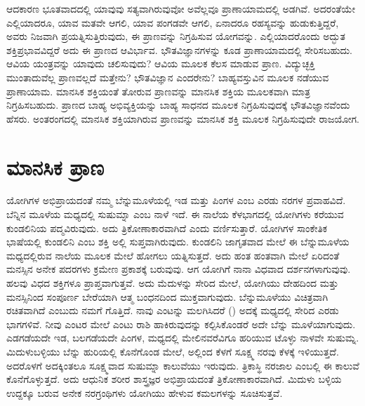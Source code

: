 ಆದಕಾರಣ ಭೂತವಾದದಲ್ಲಿ ಯಾವುವು ಸತ್ಯವಾಗಿರುವುವೋ ಅವೆಲ್ಲವೂ ಪ್ರಾಣಾಯಾಮದಲ್ಲಿ ಅಡಗಿವೆ. ಅದರಂತೆಯೇ ಎಲ್ಲಿಯಾದರೂ, ಯಾವ ಮತವೇ ಆಗಲಿ, ಯಾವ ಪಂಗಡವೇ ಆಗಲಿ, ಏನಾದರೂ ರಹಸ್ಯವನ್ನು ಹುಡುಕುತ್ತಿದ್ದರೆ, ಅವರು ನಿಜವಾಗಿ ಪ್ರಯತ್ನಿಸುತ್ತಿರುವುದು, ಈ ಪ್ರಾಣವನ್ನು ನಿಗ್ರಹಿಸುವ ಯೋಗವನ್ನು. ಎಲ್ಲಿಯಾದರೊಂದು ಅದ್ಭುತ ಶಕ್ತಿಪ್ರಭಾವವಿದ್ದರೆ ಅದು ಈ ಪ್ರಾಣದ ಆವಿರ್ಭಾವ. ಭೌತವಿಜ್ಞಾನಗಳನ್ನು ಕೂಡ ಪ್ರಾಣಾಯಾಮದಲ್ಲಿ ಸೇರಿಸಬಹುದು. ಆವಿಯ ಯಂತ್ರವನ್ನು ಯಾವುದು ಚಲಿಸುವುದು? ಆವಿಯ ಮೂಲಕ ಕೆಲಸ ಮಾಡುವ ಪ್ರಾಣ. ವಿದ್ಯುಚ್ಛಕ್ತಿ ಮುಂತಾದುವೆಲ್ಲ ಪ್ರಾಣವಲ್ಲದೆ ಮತ್ತೇನು? ಭೌತವಿಜ್ಞಾನ ಎಂದರೇನು? ಬಾಹ್ಯವಸ್ತುವಿನ ಮೂಲಕ ನಡೆಯುವ ಪ್ರಾಣಾಯಾಮ. ಮಾನಸಿಕ ಶಕ್ತಿಯಂತೆ ತೋರುವ ಪ್ರಾಣವನ್ನು ಮಾನಸಿಕ ಶಕ್ತಿಯ ಮೂಲಕವಾಗಿ ಮಾತ್ರ ನಿಗ್ರಹಿಸಬಹುದು. ಪ್ರಾಣದ ಬಾಹ್ಯ ಅಭಿವ್ಯಕ್ತಿಯನ್ನು ಬಾಹ್ಯ ಸಾಧನದ ಮೂಲಕ ನಿಗ್ರಹಿಸುವುದಕ್ಕೆ ಭೌತವಿಜ್ಞಾನವೆಂದು ಹೆಸರು. ಅಂತರಂಗದಲ್ಲಿ ಮಾನಸಿಕ ಶಕ್ತಿಯಾಗಿರುವ ಪ್ರಾಣವನ್ನು ಮಾನಸಿಕ ಶಕ್ತಿ ಮೂಲಕ ನಿಗ್ರಹಿಸುವುದೇ ರಾಜಯೋಗ.

\chapter{ಮಾನಸಿಕ ಪ್ರಾಣ}%

ಯೋಗಿಗಳ ಅಭಿಪ್ರಾಯದಂತೆ ನಮ್ಮ ಬೆನ್ನುಮೂಳೆಯಲ್ಲಿ ಇಡ ಮತ್ತು ಪಿಂಗಳ ಎಂಬ ಎರಡು ನರಗಳ ಪ್ರವಾಹವಿದೆ. ಬೆನ್ನಿನ ಮೂಳೆಯ ಮಧ್ಯದಲ್ಲಿ ಸುಷುಮ್ನಾ ಎಂಬ ನಾಳೆ ಇದೆ. ಈ ನಾಲೆಯ ಕೆಳಭಾಗದಲ್ಲಿ ಯೋಗಿಗಳು ಕರೆಯುವ ಕುಂಡಲಿನಿಯ ಪದ್ಮವಿರುವುದು. ಅದು ತ್ರಿಕೋಣಾಕಾರವಾಗಿದೆ ಎಂದು ವರ್ಣಿಸುತ್ತಾರೆ. ಯೋಗಿಗಳ ಸಾಂಕೇತಿಕ ಭಾಷೆಯಲ್ಲಿ ಕುಂಡಲಿನಿ ಎಂಬ ಶಕ್ತಿ ಅಲ್ಲಿ ಸುಪ್ತವಾಗಿರುವುದು. ಕುಂಡಲಿನಿ ಜಾಗೃತವಾದ ಮೇಲೆ ಈ ಬೆನ್ನುಮೂಳೆಯ ಮಧ್ಯದಲ್ಲಿರುವ ನಾಲೆಯ ಮೂಲಕ ಮೇಲೆ ಹೋಗಲು ಯತ್ನಿಸುತ್ತದೆ. ಅದು ಹಂತ ಹಂತವಾಗಿ ಮೇಲೆ ಏರಿದಂತೆ ಮನಸ್ಸಿನ ಅನೇಕ ಪದರಗಳು ಕ್ರಮೇಣ ಪ್ರಕಾಶಕ್ಕೆ ಬರುವುವು. ಆಗ ಯೋಗಿಗೆ ನಾನಾ ವಿಧವಾದ ದರ್ಶನಗಳಾಗುವುವು. ಹಲವು ವಿಧದ ಶಕ್ತಿಗಳೂ ಪ್ರಾಪ್ತವಾಗುತ್ತವೆ. ಅದು ಮೆದುಳನ್ನು ಸೇರಿದ ಮೇಲೆ, ಯೋಗಿಯು ದೇಹದಿಂದ ಮತ್ತು ಮನಸ್ಸಿನಿಂದ ಸಂಪೂರ್ಣ ಬೇರೆಯಾಗಿ ಆತ್ಮ ಬಂಧನದಿಂದ ಮುಕ್ತವಾಗುವುದು. ಬೆನ್ನುಮೂಳೆಯು ವಿಚಿತ್ರವಾಗಿ ರಚಿತವಾಗಿದೆ ಎಂಬುದು ನಮಗೆ ಗೊತ್ತಿದೆ. ನಾವು ಎಂಟನ್ನು ಮಲಗಿಸಿದರೆ () ಅದಕ್ಕೆ ಮಧ್ಯದಲ್ಲಿ ಸೇರಿದ ಎರಡು ಭಾಗಗಳಿವೆ. ನೀವು ಎಂಟರ ಮೇಲೆ ಎಂಟು ರಾಶಿ ಹಾಕಿರುವುದನ್ನು ಕಲ್ಪಿಸಿಕೊಂಡರೆ ಅದೇ ಬೆನ್ನು ಮೂಳೆಯಾಗುವುದು. ಎಡಗಡೆಯದೇ ಇಡ, ಬಲಗಡೆಯದೇ ಪಿಂಗಳ, ಮಧ್ಯದಲ್ಲಿ ಮೇಲಿನವರೆವಿಗೂ ಹರಿಯುವ ಟೊಳ್ಳು ನಾಳವೇ ಸುಷುಮ್ನ. ಮಿದುಳುಬಳ್ಳಿಯು ಬೆನ್ನು ಹುರಿಯಲ್ಲಿ ಕೊನೆಗೊಂಡ ಮೇಲೆ, ಅಲ್ಲಿಂದ ಕೆಳಗೆ ಸೂಕ್ಷ್ಮ ನರವು ಕೆಳಕ್ಕೆ ಇಳಿಯುತ್ತದೆ. ಅದರೊಳಗೆ ಅದಕ್ಕಿಂತಲೂ ಸೂಕ್ಷ್ಮವಾದ ಸುಷುಮ್ನಾ ಕಾಲುವೆಯು ಇರುವುದು. ತ್ರಿಕಾಸ್ಥಿ  ನರಜಾಲ ಎಂಬಲ್ಲಿ ಈ ಕಾಲುವೆ ಕೊನೆಗೊಳ್ಳುತ್ತದೆ. ಅದು ಆಧುನಿಕ ಶರೀರ ಶಾಸ್ತ್ರಜ್ಞರ ಅಭಿಪ್ರಾಯದಂತೆ ತ್ರಿಕೋಣಾಕಾರವಾಗಿದೆ. ಮಿದುಳು ಬಳ್ಳಿಯ ಉದ್ದಕ್ಕೂ ಬರುವ ಅನೇಕ ನರಗ್ರಂಥಿಗಳು ಯೋಗಿಯು ಹೇಳುವ ಕಮಲಗಳನ್ನು ಸೂಚಿಸುತ್ತವೆ. 


